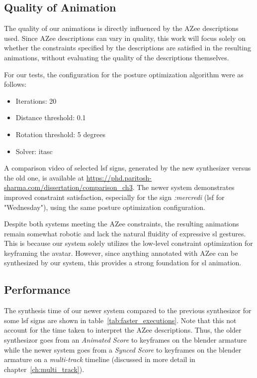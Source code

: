 \documentclass[../../main.tex]{subfiles}
\begin{document}
{\subsection{Quality of Animation}
\label{ch:avatar_creation_pose_synthesis:evaluation:quality}

The quality of our animations is directly influenced by the AZee descriptions used. Since AZee descriptions can vary in quality, this work will focus solely on whether the constraints specified by the descriptions are satisfied in the resulting animations, without evaluating the quality of the descriptions themselves.

For our tests, the configuration for the posture optimization algorithm were as follows:
\begin{itemize}
    \item Iterations: 20
    \item Distance threshold: 0.1
    \item Rotation threshold: 5 degrees
    \item Solver: \gls{itasc}
\end{itemize}

A comparison video of selected \gls{lsf} signs, generated by the new synthesizer versus the old one, is available at \url{https://phd.paritosh-sharma.com/dissertation/comparison_ch3}. The newer system demonstrates improved constraint satisfaction, especially for the sign \emph{:mercredi} (\gls{lsf} for "Wednesday"), using the same posture optimization configuration.

Despite both systems meeting the AZee constraints, the resulting animations remain somewhat robotic and lack the natural fluidity of expressive \gls{sl} gestures. This is because our system solely utilizes the low-level constraint optimization for keyframing the avatar. However, since anything annotated with AZee can be synthesized by our system, this provides a strong foundation for \gls{sl} animation.

\subsection{Performance}
\label{ch:avatar_creation_pose_synthesis:evaluation:performance}

The synthesis time of our newer system compared to the previous synthesizor for some \gls{lsf} signs are shown in table~\ref{tab:faster_executions}. Note that this not account for the time taken to interpret the AZee descriptions. Thus, the older synthesizor goes from an \emph{Animated Score} to keyframes on the blender armature while the newer system goes from a \emph{Synced Score} to keyframes on the blender armature on a \emph{multi-track} timeline (discussed in more detail in chapter~\ref{ch:multi_track}).

}
\end{document}
